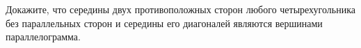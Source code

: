 \begin{ex}
	\begin{condition}
		Докажите, что середины двух противоположных сторон любого четырехугольника без параллельных сторон и середины его диагоналей являются вершинами параллелограмма.
	\end{condition}
\end{ex}